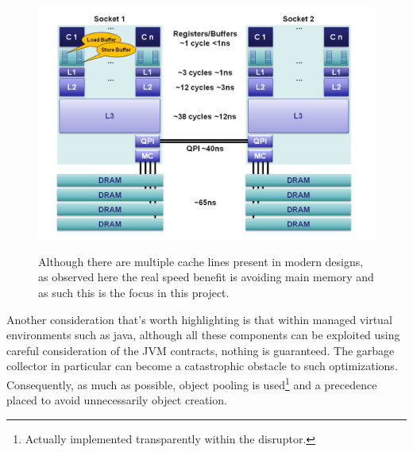 \documentclass[a4paper,11pt]{scrreprt}
\begin{document}
\begin{figure}[h!]
\centering
\caption{Although there are multiple cache lines present in modern designs, as observed here the real speed benefit is avoiding main memory and as such this is the focus in this project.}
\includegraphics[scale=0.5] {cachelinespeed.png}
\label{fig:cachelinespeeds}
\end{figure}
Another consideration that's worth highlighting is that within managed virtual environments such as java, although all these components can be exploited using careful consideration of the JVM contracts, nothing is guaranteed. The garbage collector in particular can become a catastrophic obstacle to such optimizations. Consequently, as much as possible, object pooling is used\footnote{Actually implemented transparently within the disruptor.} and a precedence placed to avoid unnecessarily object creation.
\end{document}
